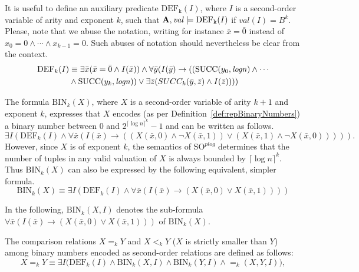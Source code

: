 \documentclass{article}
\begin{document}
It is useful to define an auxiliary predicate $\mathrm{DEF_k}(I)$, where $I$ is a second-order variable of arity and exponent $k$, such that ${\bf A}, \mathit{val} \models \mathrm{DEF_k}(I)$ if $\mathit{val}(I) = B^k$. Please, note that we abuse the notation, writing for instance $\bar{x} = \bar{0}$ instead of $x_0 = 0 \wedge \cdots \wedge x_{k-1} = 0$. Such abuses of notation should nevertheless be clear from the context.   
\begin{align}
\mathrm{DEF}_k(I) & \equiv \exists \bar{x} ( \bar{x} = \bar{0} \wedge I(\bar{x})) \wedge \forall \bar{y} (I(\bar{y}) \rightarrow ((\mathrm{SUCC}(y_0, \mathit{logn}) \wedge \cdots \notag \\
&  \wedge  \mathrm{SUCC}(y_k, \mathit{logn})) \vee \exists \bar{z} (SUCC_k(\bar{y},\bar{z}) \wedge I(\bar{z})))) \label{arith3}
\end{align}

The formula $\mathrm{BIN}_k(X)$, where $X$ is a second-order variable of arity $k+1$ and exponent $k$, expresses that $X$ encodes (as per Definition~\ref{def:repBinaryNumbers}) a binary number between $0$ and $2^{\lceil\log n \rceil^k} - 1$ and can be written as follows. 
\[ \exists I (\mathrm{DEF}_k(I) \wedge \forall \bar{x} (I(\bar{x}) \to ((X(\bar{x},0) \wedge \neg X(\bar{x},1)) \vee (X(\bar{x},1) \wedge \neg X(\bar{x},0))))).\]
However, since $X$ is of exponent $k$, the semantics of $\mathrm{SO}^{\mathit{plog}}$ determines that the number of tuples in any valid valuation of $X$ is always bounded by $\lceil\log n \rceil^k$. Thus $\mathrm{BIN}_k(X)$ can also be expressed by the following equivalent, simpler formula.
\begin{equation}
\mathrm{BIN}_k(X) \equiv \exists I (\mathrm{DEF}_k(I) \wedge \forall \bar{x} (I(\bar{x}) \to (X(\bar{x},0) \vee X(\bar{x},1)))) \label{arith4}
\end{equation}

In the following, $\mathrm{BIN}_k(X, I)$ denotes the sub-formula $\forall \bar{x} (I(\bar{x}) \to (X(\bar{x},0) \vee X(\bar{x},1)))$ of $\mathrm{BIN}_k(X)$. 

The comparison relations $X =_k Y$ and $X <_k Y$ ($X$ is strictly smaller than $Y$) among binary numbers encoded as second-order relations are defined as follows:
\begin{equation}
X =_k Y \equiv \exists I \big(\mathrm{DEF}_k(I) \wedge \mathrm{BIN}_k(X, I) \wedge \mathrm{BIN}_k(Y,I) \wedge {=_k}(X, Y, I) \big), \label{arith5}
\end{equation}
\end{document}
